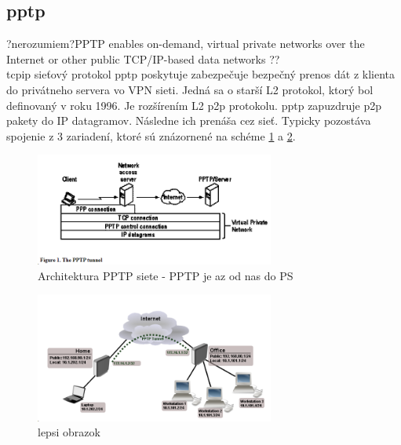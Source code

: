 \subsection{\acrfull{pptp}}

?nerozumiem?PPTP enables on-demand, virtual private networks over the Internet or other public TCP/IP-based data networks ??\\

\acrshort{tcpip} sieťový protokol \acrshort{pptp} poskytuje zabezpečuje bezpečný prenos dát z klienta do privátneho servera vo VPN sieti. Jedná sa o starší L2 protokol, ktorý bol definovaný v roku 1996. Je rozšírením L2 \acrshort{p2p} protokolu. \acrshort{pptp} zapuzdruje \acrshort{p2p} pakety do  IP datagramov. Následne ich prenáša cez sieť. Typicky pozostáva spojenie z 3 zariadení, ktoré sú znázornené na schéme \ref{ptptun} a \ref{pptpcon}. 

\begin{figure}[h]
	\centering
	\includegraphics[width=0.7\textwidth]{figures/ptptun}
	\caption{Architektura PPTP siete - PPTP je az od nas do PS}
	\label{ptptun}
\end{figure}
\begin{figure}[h]
	\centering
	\includegraphics[width=0.7\textwidth]{figures/pptpcon}
	\caption{lepsi obrazok}
	\label{pptpcon}
\end{figure}

